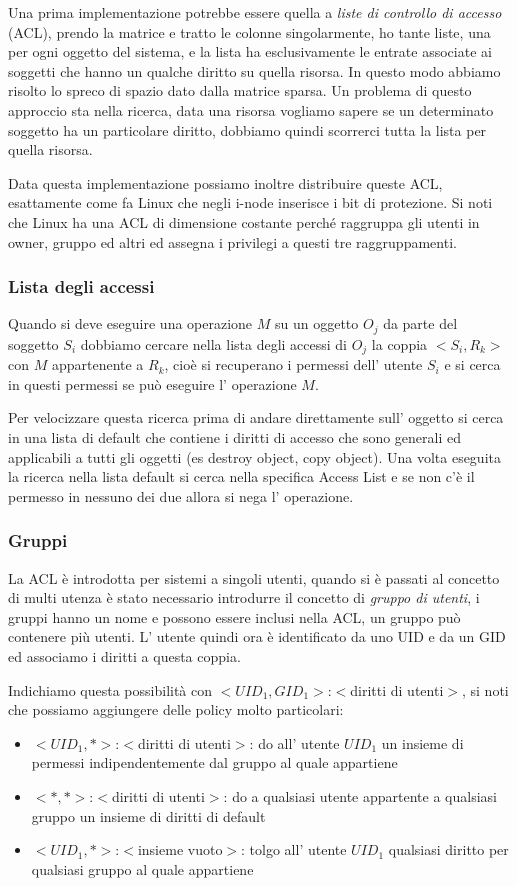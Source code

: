 Una prima implementazione potrebbe essere quella a \emph{liste di controllo di accesso} (ACL), prendo la matrice e tratto le colonne singolarmente, ho tante liste, una per ogni oggetto del sistema, e la lista ha esclusivamente le entrate associate ai soggetti che hanno un qualche diritto su quella risorsa.
In questo modo abbiamo risolto lo spreco di spazio dato dalla matrice sparsa.
Un problema di questo approccio sta nella ricerca, data una risorsa vogliamo sapere se un determinato soggetto ha un particolare diritto, dobbiamo quindi scorrerci tutta la lista per quella risorsa.

Data questa implementazione possiamo inoltre distribuire queste ACL, esattamente come fa Linux che negli i-node inserisce i bit di protezione.
Si noti che Linux ha una ACL di dimensione costante perché raggruppa gli utenti in owner, gruppo ed altri ed assegna i privilegi a questi tre raggruppamenti.

\subsubsection{Lista degli accessi}
Quando si deve eseguire una operazione $M$ su un oggetto $O_j$ da parte del soggetto $S_i$ dobbiamo cercare nella lista degli accessi di $O_j$ la coppia $<S_i, R_k>$ con $M$ appartenente a $R_k$, cioè si recuperano i permessi dell' utente $S_i$ e si cerca in questi permessi se può eseguire l' operazione $M$.

Per velocizzare questa ricerca prima di andare direttamente sull' oggetto si cerca in una lista di default che contiene i diritti di accesso che sono generali ed applicabili a tutti gli oggetti (es destroy object, copy object).
Una volta eseguita la ricerca nella lista default si cerca nella specifica Access List e se non c'è il permesso in nessuno dei due allora si nega l' operazione.

\subsubsection{Gruppi}
La ACL è introdotta per sistemi a singoli utenti, quando si è passati al concetto di multi utenza è stato necessario introdurre il concetto di \emph{gruppo di utenti}, i gruppi hanno un nome e possono essere inclusi nella ACL, un gruppo può contenere più utenti.
L' utente quindi ora è identificato da uno UID e da un GID ed associamo i diritti a questa coppia.

Indichiamo questa possibilità con $<UID_1, GID_1>$:$<$diritti di utenti$>$, si noti che possiamo aggiungere delle policy molto particolari:
\begin{itemize}
    \item $<UID_1, *>$:$<$diritti di utenti$>$: do all' utente $UID_1$ un insieme di permessi indipendentemente dal gruppo al quale appartiene
    \item $<*, *>$:$<$diritti di utenti$>$: do a qualsiasi utente appartente a qualsiasi gruppo un insieme di diritti di default
    \item $<UID_1, *>$:$<$insieme vuoto$>$: tolgo all' utente $UID_1$ qualsiasi diritto per qualsiasi gruppo al quale appartiene
\end{itemize}

